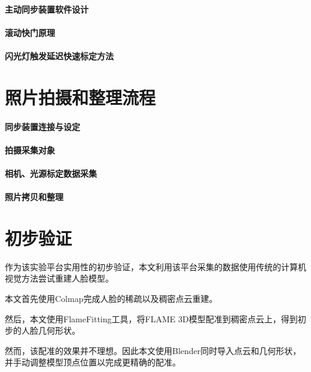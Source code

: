 \paragraph{主动同步装置软件设计}

\paragraph{滚动快门原理}

\paragraph{闪光灯触发延迟快速标定方法}

\section{照片拍摄和整理流程}

\paragraph{同步装置连接与设定}

\paragraph{拍摄采集对象}

\paragraph{相机、光源标定数据采集}

\paragraph{照片拷贝和整理}

\section{初步验证}

作为该实验平台实用性的初步验证，本文利用该平台采集的数据使用传统的计算机视觉方法尝试重建人脸模型。

本文首先使用Colmap完成人脸的稀疏以及稠密点云重建。

然后，本文使用FlameFitting工具，将FLAME 3D模型配准到稠密点云上，得到初步的人脸几何形状。

然而，该配准的效果并不理想。因此本文使用Blender同时导入点云和几何形状，并手动调整模型顶点位置以完成更精确的配准。

